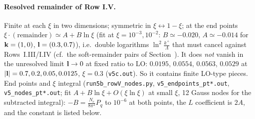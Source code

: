 \paragraph{Resolved remainder of Row I.V.} Finite at each $\xi$ in two dimensions; symmetric in $\xi\leftrightarrow1-\xi$; at the end points $\xi\cdot(\text{remainder})\simeq A+B\ln\xi$ (fit at $\xi=10^{-3},10^{-2}$: $B\simeq-0.020$, $A\simeq-0.014$ for $\mathbf{k}=(1,0)$, $\mathbf{l}=(0.3,0.7)$), i.e.\ double logarithms $\ln^2\frac{k^+}{\Lambda}$ that must cancel against Rows~I.III/I.IV (cf.\ the soft-remainder pairs of Section~). It does \emph{not} vanish in the unresolved limit $\mathbf{l}\to0$ at fixed ratio to LO: $0.0195$, $0.0554$, $0.0563$, $0.0529$ at $|\mathbf{l}|=0.7,0.2,0.05,0.0125$, $\xi=0.3$ (\texttt{v5c.out}). So it contains finite LO-type pieces. End points and $\xi$ integral (\texttt{run5b\_rowV\_nodes.py}, \texttt{v5\_endpoints\_pt*.out}, \texttt{v5\_nodes\_pt*.out}; fit $A+B\ln\xi+O(\xi\ln\xi)$ at small $\xi$, 12 Gauss nodes for the subtracted integral): $-B=\frac{N_c}{8\pi^2}P_q$ to $10^{-6}$ at both points, the $L$ coefficient is $2A$, and the constant is listed below.

